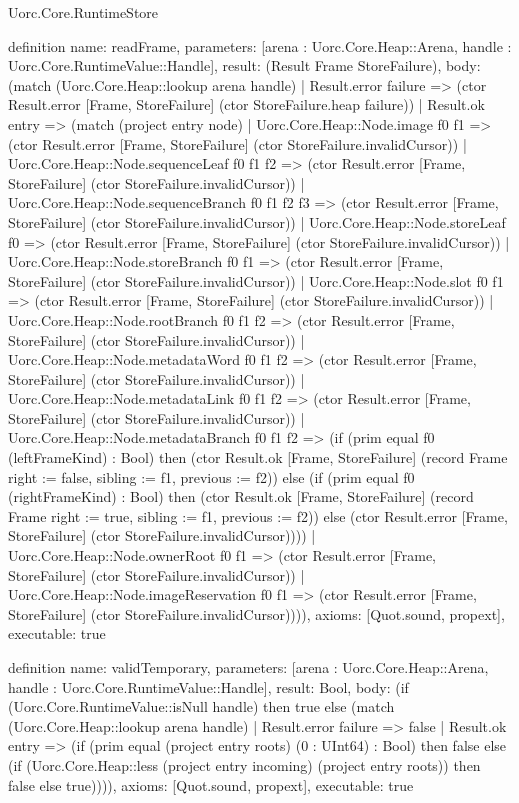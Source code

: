 \begin{lexlean}{Uorc.Core.RuntimeStore}
\begin{semanticmodule}
definition{
  name: readFrame,
  parameters: [arena : Uorc.Core.Heap::Arena, handle : Uorc.Core.RuntimeValue::Handle],
  result: (Result Frame StoreFailure),
  body: (match (Uorc.Core.Heap::lookup arena handle)
    | Result.error failure => (ctor Result.error [Frame, StoreFailure] (ctor StoreFailure.heap failure))
    | Result.ok entry => (match (project entry node)
      | Uorc.Core.Heap::Node.image f0 f1 => (ctor Result.error [Frame, StoreFailure] (ctor StoreFailure.invalidCursor))
      | Uorc.Core.Heap::Node.sequenceLeaf f0 f1 f2 => (ctor Result.error [Frame, StoreFailure] (ctor StoreFailure.invalidCursor))
      | Uorc.Core.Heap::Node.sequenceBranch f0 f1 f2 f3 => (ctor Result.error [Frame, StoreFailure] (ctor StoreFailure.invalidCursor))
      | Uorc.Core.Heap::Node.storeLeaf f0 => (ctor Result.error [Frame, StoreFailure] (ctor StoreFailure.invalidCursor))
      | Uorc.Core.Heap::Node.storeBranch f0 f1 => (ctor Result.error [Frame, StoreFailure] (ctor StoreFailure.invalidCursor))
      | Uorc.Core.Heap::Node.slot f0 f1 => (ctor Result.error [Frame, StoreFailure] (ctor StoreFailure.invalidCursor))
      | Uorc.Core.Heap::Node.rootBranch f0 f1 f2 => (ctor Result.error [Frame, StoreFailure] (ctor StoreFailure.invalidCursor))
      | Uorc.Core.Heap::Node.metadataWord f0 f1 f2 => (ctor Result.error [Frame, StoreFailure] (ctor StoreFailure.invalidCursor))
      | Uorc.Core.Heap::Node.metadataLink f0 f1 f2 => (ctor Result.error [Frame, StoreFailure] (ctor StoreFailure.invalidCursor))
      | Uorc.Core.Heap::Node.metadataBranch f0 f1 f2 => (if (prim equal f0 (leftFrameKind) : Bool) then (ctor Result.ok [Frame, StoreFailure] (record Frame {right := false, sibling := f1, previous := f2})) else (if (prim equal f0 (rightFrameKind) : Bool) then (ctor Result.ok [Frame, StoreFailure] (record Frame {right := true, sibling := f1, previous := f2})) else (ctor Result.error [Frame, StoreFailure] (ctor StoreFailure.invalidCursor))))
      | Uorc.Core.Heap::Node.ownerRoot f0 f1 => (ctor Result.error [Frame, StoreFailure] (ctor StoreFailure.invalidCursor))
      | Uorc.Core.Heap::Node.imageReservation f0 f1 => (ctor Result.error [Frame, StoreFailure] (ctor StoreFailure.invalidCursor)))),
  axioms: [Quot.sound, propext],
  executable: true
}

definition{
  name: validTemporary,
  parameters: [arena : Uorc.Core.Heap::Arena, handle : Uorc.Core.RuntimeValue::Handle],
  result: Bool,
  body: (if (Uorc.Core.RuntimeValue::isNull handle) then true else (match (Uorc.Core.Heap::lookup arena handle)
    | Result.error failure => false
    | Result.ok entry => (if (prim equal (project entry roots) (0 : UInt64) : Bool) then false else (if (Uorc.Core.Heap::less (project entry incoming) (project entry roots)) then false else true)))),
  axioms: [Quot.sound, propext],
  executable: true
}


\end{semanticmodule}
\end{lexlean}
